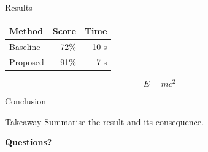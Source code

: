 \documentclass[11pt,aspectratio=169]{beamer}
\begin{document}
\begin{frame}{Results}
\begin{table}
\centering
\begin{tabular}{lrr}
\toprule
\textbf{Method} & \textbf{Score} & \textbf{Time} \\
\midrule
Baseline & 72\% & 10 s \\
Proposed & 91\% & 7 s \\
\bottomrule
\end{tabular}
\end{table}

\[
E = mc^2
\]
\end{frame}

\begin{frame}{Conclusion}
\begin{alertblock}{Takeaway}
    Summarise the result and its consequence.
\end{alertblock}
\vfill
\begin{center}
\textbf{\textcolor{LrssnPrimaryText}{Questions?}}
\end{center}
\end{frame}
\end{document}
